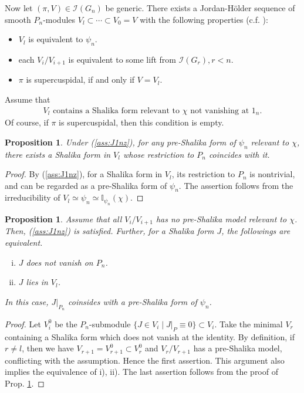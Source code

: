 \documentclass[11pt]{amsart}
\newcommand\Ib{{\mathbb{I}}}
\newcommand\1{\mathbf{1}}
\newcommand\Ir{{\mathscr{I}}}
\numberwithin{equation}{section}
\newtheorem{prop}[thm]{Proposition}
\begin{document}
Now let $(\pi,V) \in \Ir(G_{n})$ be generic.
There exists a Jordan-H\"{o}lder sequence of smooth $P_{n}$-modules $V_l \subset \cdots \subset V_0 = V$ with the following properties (c.f. \cite{B-Z}):
\begin{itemize}
\item $V_l$ is equivalent to $\psi_n$.
\item each $V_i/V_{i + 1}$ is equivalent to some lift from $\Ir(G_r), r < n$.
\item $\pi$ is supercuspidal, if and only if $V = V_l$.
\end{itemize}
Assume that 
\begin{align}
\mbox{$V_l$ contains a Shalika form relevant to $\chi$ not vanishing at $1_n$}. \label{ass:J1nz}
\end{align} 
Of course, if $\pi$ is supercuspidal, then this condition is empty.
\begin{prop}\label{prop:SPS}
Under (\ref{ass:J1nz}), for any pre-Shalika form of $\psi_n$ relevant to $\chi$, there exists a Shalika form in $V_l$ whose restriction to $P_{n}$ coincides with it.
\end{prop}
\begin{proof}
By (\ref{ass:J1nz}), for a Shalika form in $V_l$, its restriction to $P_n$ is nontrivial, and can be regarded as a pre-Shalika form of $\psi_n$.
The assertion follows from the irreducibility of $V_l \simeq \psi_n \simeq \Ib_{\psi_n}(\chi)$.
\end{proof}
\begin{prop}\label{prop:asaV}
Assume that all $V_i/V_{i+1}$ has no pre-Shalika model relevant to $\chi$.
Then, (\ref{ass:J1nz}) is satisfied.
Further, for a Shalika form $J$, the followings are equivalent.
\begin{enumerate}[i)]
\item $J$ does not vanish on $P_n$.
\item $J$ lies in $V_l$.
\end{enumerate}
In this case, $J|_{P_n}$ coinsides with a pre-Shalika form of $\psi_n$.
\end{prop}
\begin{proof}
Let $V_i^0$ be the $P_n$-submodule $\{J \in V_i \mid J|_{P} \equiv 0 \} \subset V_i$.
Take the minimal $V_r$ containing a Shalika form which does not vanish at the identity.
By definition, if $r \neq l$, then we have $V_{r+1} = V_{r+1}^0 \subset V_r^0$ and $V_r/V_{r+1}$ has a pre-Shalika model, conflicting with the assumption.
Hence the first assertion. 
This argument also implies the equivalence of i), ii).
The last assertion follows from the proof of Prop. \ref{prop:SPS}.
\end{proof}
\end{document}
